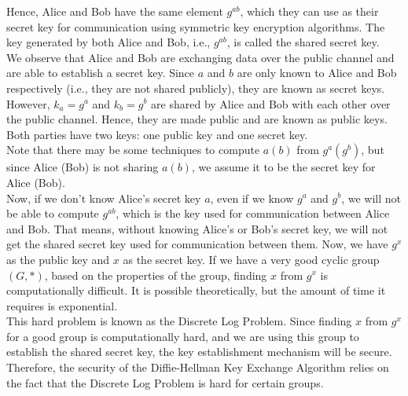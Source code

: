 \documentclass[11pt]{article}
\begin{document}
Hence, Alice and Bob have the same element \( g^{ab} \), which they can use as their secret key for communication using symmetric key encryption algorithms. The key generated by both Alice and Bob, i.e., \( g^{ab} \), is called the shared secret key.\\
\newline
We observe that Alice and Bob are exchanging data over the public channel and are able to establish a secret key. Since \( a \) and \( b \) are only known to Alice and Bob respectively (i.e., they are not shared publicly), they are known as secret keys. However, \( k_a = g^a \) and \( k_b = g^b \) are shared by Alice and Bob with each other over the public channel. Hence, they are made public and are known as public keys. Both parties have two keys: one public key and one secret key.\\
\newline
Note that there may be some techniques to compute \( a(b) \) from \( g^a(g^b) \), but since Alice (Bob) is not sharing \( a(b) \), we assume it to be the secret key for Alice (Bob).\\
\newline
Now, if we don't know Alice's secret key \( a \), even if we know \( g^a \) and \( g^b \), we will not be able to compute \( g^{ab} \), which is the key used for communication between Alice and Bob. That means, without knowing Alice's or Bob's secret key, we will not get the shared secret key used for communication between them.
\newline
Now, we have \( g^x \) as the public key and \( x \) as the secret key. If we have a very good cyclic group \( (G, *) \), based on the properties of the group, finding \( x \) from \( g^x \) is computationally difficult. It is possible theoretically, but the amount of time it requires is exponential.\\ \newline
This hard problem is known as the Discrete Log Problem. Since finding \( x \) from \( g^x \) for a good group is computationally hard, and we are using this group to establish the shared secret key, the key establishment mechanism will be secure. Therefore, the security of the Diffie-Hellman Key Exchange Algorithm relies on the fact that the Discrete Log Problem is hard for certain groups.
\newline
\end{document}

